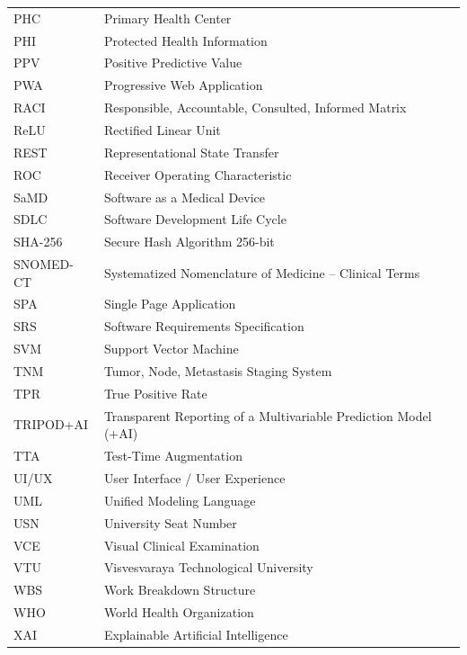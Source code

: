 \documentclass[12pt,a4paper,oneside]{report}
\begin{document}
\begin{longtable}{p{3.2cm} p{10.8cm}}
PHC         & Primary Health Center \\
PHI         & Protected Health Information \\
PPV         & Positive Predictive Value \\
PWA         & Progressive Web Application \\
RACI        & Responsible, Accountable, Consulted, Informed Matrix \\
ReLU        & Rectified Linear Unit \\
REST        & Representational State Transfer \\
ROC         & Receiver Operating Characteristic \\
SaMD        & Software as a Medical Device \\
SDLC        & Software Development Life Cycle \\
SHA-256     & Secure Hash Algorithm 256-bit \\
SNOMED-CT   & Systematized Nomenclature of Medicine -- Clinical Terms \\
SPA         & Single Page Application \\
SRS         & Software Requirements Specification \\
SVM         & Support Vector Machine \\
TNM         & Tumor, Node, Metastasis Staging System \\
TPR         & True Positive Rate \\
TRIPOD+AI   & Transparent Reporting of a Multivariable Prediction Model (+AI) \\
TTA         & Test-Time Augmentation \\
UI/UX       & User Interface / User Experience \\
UML         & Unified Modeling Language \\
USN         & University Seat Number \\
VCE         & Visual Clinical Examination \\
VTU         & Visvesvaraya Technological University \\
WBS         & Work Breakdown Structure \\
WHO         & World Health Organization \\
XAI         & Explainable Artificial Intelligence \\
\end{longtable}

\newpage
{}
\setcounter{page}{1}
\pagestyle{fancy}
\end{document}
